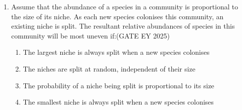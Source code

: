 \begin{enumerate}[leftmargin=*,label=\textbf{Q.\arabic*},resume]
\begin{multicols}{2}
\begin{enumerate}
\item Crocodiles are more closely related to birds than to the other reptiles
\item Fish, lizards and snakes have a common ancestor
\item Mammals and reptiles have evolved from amphibians
\item Mammals are more closely related to crocodiles than to amphibians
\end{enumerate}
\end{multicols}

\item Assume that the abundance of a species in a community is proportional to the size of its niche. As each new species colonises this community, an existing niche is split. The resultant relative abundances of species in this community will be most uneven if:\hfill {(GATE EY 2025)}
\begin{multicols}{2}
\begin{enumerate}
\item The largest niche is always split when a new species colonises
\item The niches are split at random, independent of their size
\item The probability of a niche being split is proportional to its size
\item The smallest niche is always split when a new species colonises
\end{enumerate}
\end{multicols}

\end{enumerate}
\newpage
{}

